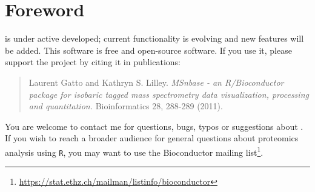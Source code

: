 \section*{Foreword}


 is under active developed; current functionality is evolving and 
new features will be added. This software is free and open-source software. 
If you use it, please support the project by citing it in publications:

\begin{quote}
  Laurent Gatto and Kathryn S. Lilley. \textit{MSnbase - an R/Bioconductor 
    package for isobaric tagged mass spectrometry data visualization,
    processing and quantitation.} Bioinformatics 28, 288-289 (2011).
\end{quote}

You are welcome to contact me for questions, bugs, typos or suggestions about . 
If you wish to reach a broader audience for general questions about proteomics analysis using \texttt{R}, 
you may want to use the Bioconductor mailing 
list\footnote{\url{https://stat.ethz.ch/mailman/listinfo/bioconductor}}.
